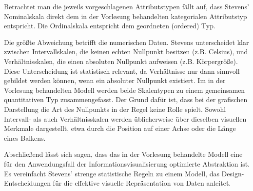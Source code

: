 \documentclass[12pt, a4paper]{article}
\begin{document}
Betrachtet man die jeweils vorgeschlagenen Attributstypen fällt auf, dass Stevens' Nominalskala direkt dem in der Vorlesung behandelten kategorialen Attributstyp
entspricht. Die Ordinalskala entspricht dem geordneten (ordered) Typ.

Die größte Abweichung betrifft die numerischen Daten. Stevens unterscheidet klar zwischen Intervallskalen, die keinen echten Nullpunkt besitzen (z.B. Celsius), und
Verhältnisskalen, die einen absoluten Nullpunkt aufweisen (z.B. Körpergröße).
Diese Unterscheidung ist statistisch relevant, da Verhältnisse nur dann sinnvoll gebildet werden können, wenn ein absoluter Nullpunkt existiert.
Im in der Vorlesung behandelten Modell werden beide Skalentypen zu einem gemeinsamen quantitativen Typ zusammengefasst.
Der Grund dafür ist, dass bei der grafischen Darstellung die Art des Nullpunkts in der Regel keine Rolle spielt.
Sowohl Intervall- als auch Verhältnisskalen werden üblicherweise über dieselben visuellen Merkmale dargestellt, etwa durch die Position auf einer Achse oder die Länge eines Balkens.

Abschließend lässt sich sagen, dass das in der Vorlesung behandelte Modell eine für den Anwendungsfall der Informationsvisualisierung optimierte Abstraktion ist. 
Es vereinfacht Stevens' strenge statistische Regeln zu einem Modell, das Design-Entscheidungen für die effektive visuelle Repräsentation von Daten anleitet.
\end{document}
